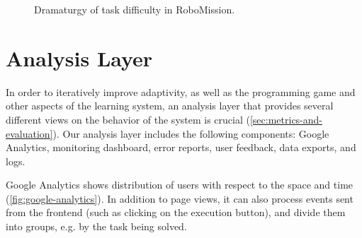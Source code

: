 \begin{figure}[htb]
\centering
{}
\caption{Dramaturgy of task difficulty in RoboMission.}
\label{fig:robomission.flow}
\end{figure}






\section{Analysis Layer}
\label{sec:robomission.analysis-layer}

In order to iteratively improve adaptivity, as well as the programming game
and other aspects of the learning system,
an analysis layer
that provides several different views on the behavior of the system
is crucial (\cref{sec:metrics-and-evaluation}).
Our analysis layer includes the following components:
Google Analytics, monitoring dashboard, error reports, user feedback,
data exports, and logs.

Google Analytics
  shows distribution of users with respect to the space and time
  (\cref{fig:google-analytics}).
  In addition to page views,
  it can also process events sent from the frontend
  (such as clicking on the execution button),
  and divide them into groups, e.g. by the task being solved.



